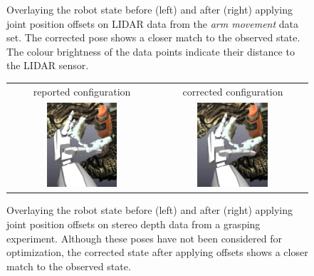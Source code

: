 \begin{figure}
\begin{tabular}{c:c}
\end{tabular}
\caption[Calibrated pose on LIAR data]{Overlaying the robot state before (left) and after (right) applying joint position offsets on LIDAR data from the \textit{arm movement} data set. The corrected pose shows a closer match to the observed state. The colour brightness of the data points indicate their distance to the LIDAR sensor.}
\label{fig:lidar_corrected_state}
\end{figure}


\begin{figure}[h]
\centering
\begin{tabular}{c:c}
reported configuration & corrected configuration \\
\includegraphics[width=0.5\textwidth]{images/offset/visual_verification/rep_grasp.png} & \includegraphics[width=0.5\textwidth]{images/offset/visual_verification/corr_grasp.png} \\
\end{tabular}
\caption[Calibrated pose on stereo depth data]{Overlaying the robot state before (left) and after (right) applying joint position offsets on stereo depth data from a grasping experiment. Although these poses have not been considered for optimization, the corrected state after applying offsets shows a closer match to the observed state.}
\label{fig:stereo_corrected_state}
\end{figure}

